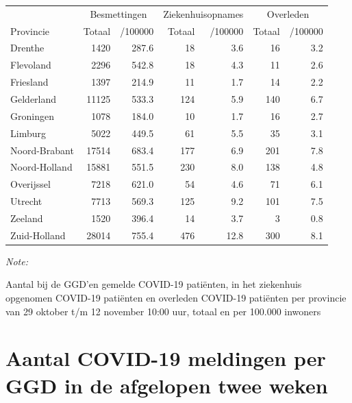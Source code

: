 \documentclass[
  english,
  man,floatsintext]{apa6}
\begin{document}
\begin{table}[H]
\centering
\begin{threeparttable}
\begin{tabular}{lrrrrrr}
\toprule
\multicolumn{1}{c}{ } & \multicolumn{2}{c}{Besmettingen} & \multicolumn{2}{c}{Ziekenhuisopnames} & \multicolumn{2}{c}{Overleden} \\
\cmidrule(l{3pt}r{3pt}){2-3} \cmidrule(l{3pt}r{3pt}){4-5} \cmidrule(l{3pt}r{3pt}){6-7}
Provincie & Totaal & /100000 & Totaal & /100000 & Totaal & /100000\\
\midrule
Drenthe & 1420 & 287.6 & 18 & 3.6 & 16 & 3.2\\
Flevoland & 2296 & 542.8 & 18 & 4.3 & 11 & 2.6\\
Friesland & 1397 & 214.9 & 11 & 1.7 & 14 & 2.2\\
Gelderland & 11125 & 533.3 & 124 & 5.9 & 140 & 6.7\\
Groningen & 1078 & 184.0 & 10 & 1.7 & 16 & 2.7\\
Limburg & 5022 & 449.5 & 61 & 5.5 & 35 & 3.1\\
Noord-Brabant & 17514 & 683.4 & 177 & 6.9 & 201 & 7.8\\
Noord-Holland & 15881 & 551.5 & 230 & 8.0 & 138 & 4.8\\
Overijssel & 7218 & 621.0 & 54 & 4.6 & 71 & 6.1\\
Utrecht & 7713 & 569.3 & 125 & 9.2 & 101 & 7.5\\
Zeeland & 1520 & 396.4 & 14 & 3.7 & 3 & 0.8\\
Zuid-Holland & 28014 & 755.4 & 476 & 12.8 & 300 & 8.1\\
\bottomrule
\end{tabular}
\begin{tablenotes}
\item \textit{Note: } 
\item Aantal bij de GGD’en gemelde COVID-19 patiënten, in het ziekenhuis opgenomen COVID-19 patiënten en overleden COVID-19 patiënten per provincie van 29 oktober t/m 12 november 10:00 uur, totaal en per 100.000 inwoners
\end{tablenotes}
\end{threeparttable}
\end{table}

\newpage

\hypertarget{aantal-covid-19-meldingen-per-ggd-in-de-afgelopen-twee-weken}{%
\section{Aantal COVID-19 meldingen per GGD in de afgelopen twee weken}\label{aantal-covid-19-meldingen-per-ggd-in-de-afgelopen-twee-weken}}
\end{document}
